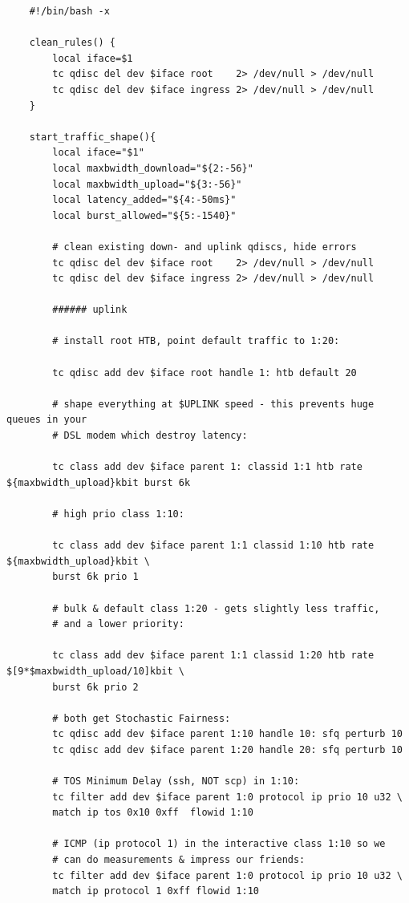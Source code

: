 \begin{verbatim}
    #!/bin/bash -x
    
    clean_rules() {
        local iface=$1
        tc qdisc del dev $iface root    2> /dev/null > /dev/null
        tc qdisc del dev $iface ingress 2> /dev/null > /dev/null
    }
    
    start_traffic_shape(){
        local iface="$1"
        local maxbwidth_download="${2:-56}"
        local maxbwidth_upload="${3:-56}"
        local latency_added="${4:-50ms}"
        local burst_allowed="${5:-1540}"
    
        # clean existing down- and uplink qdiscs, hide errors
        tc qdisc del dev $iface root    2> /dev/null > /dev/null
        tc qdisc del dev $iface ingress 2> /dev/null > /dev/null
    
        ###### uplink
    
        # install root HTB, point default traffic to 1:20:
    
        tc qdisc add dev $iface root handle 1: htb default 20
    
        # shape everything at $UPLINK speed - this prevents huge queues in your
        # DSL modem which destroy latency:
    
        tc class add dev $iface parent 1: classid 1:1 htb rate ${maxbwidth_upload}kbit burst 6k
    
        # high prio class 1:10:
    
        tc class add dev $iface parent 1:1 classid 1:10 htb rate ${maxbwidth_upload}kbit \
        burst 6k prio 1
    
        # bulk & default class 1:20 - gets slightly less traffic,
        # and a lower priority:
    
        tc class add dev $iface parent 1:1 classid 1:20 htb rate $[9*$maxbwidth_upload/10]kbit \
        burst 6k prio 2
    
        # both get Stochastic Fairness:
        tc qdisc add dev $iface parent 1:10 handle 10: sfq perturb 10
        tc qdisc add dev $iface parent 1:20 handle 20: sfq perturb 10
    
        # TOS Minimum Delay (ssh, NOT scp) in 1:10:
        tc filter add dev $iface parent 1:0 protocol ip prio 10 u32 \
        match ip tos 0x10 0xff  flowid 1:10
    
        # ICMP (ip protocol 1) in the interactive class 1:10 so we
        # can do measurements & impress our friends:
        tc filter add dev $iface parent 1:0 protocol ip prio 10 u32 \
        match ip protocol 1 0xff flowid 1:10
    

\end{verbatim}

